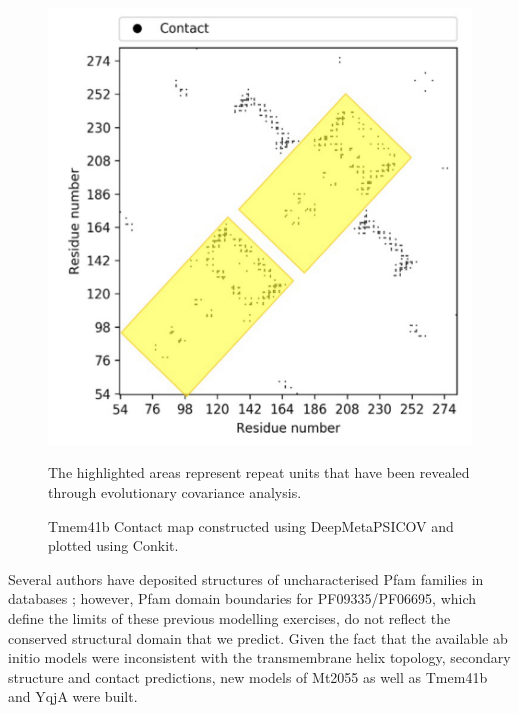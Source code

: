 \begin{figure}[th!]
    \includegraphics[width=\textwidth]{Results/fig3.png}
    \caption{Tmem41b Contact map constructed using DeepMetaPSICOV and plotted using Conkit.}
    \label{fig:tm_c_map}
    \small
    The highlighted areas represent repeat units that have been revealed through evolutionary covariance analysis.
\end{figure}

Several authors have deposited structures of uncharacterised Pfam families in databases \cite{El-Gebali2019}; however, Pfam domain boundaries for PF09335/PF06695, which define the limits of these previous modelling exercises, do not reflect the conserved structural domain that we predict. Given the fact that the available ab initio models were inconsistent with the transmembrane helix topology, secondary structure and contact predictions, new models of Mt2055 as well as Tmem41b and YqjA were built. 

